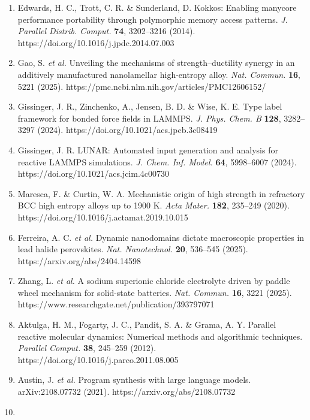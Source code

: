 \documentclass[
  11pt,
]{article}
\begin{document}
\begin{enumerate}
  Implementing molecular dynamics on hybrid high performance computers
  --- short range forces. \emph{Comput. Phys. Commun.} \textbf{182},
  898--911 (2011). https://doi.org/10.1016/j.cpc.2010.12.021
\item
  Edwards, H. C., Trott, C. R. \& Sunderland, D. Kokkos: Enabling
  manycore performance portability through polymorphic memory access
  patterns. \emph{J. Parallel Distrib. Comput.} \textbf{74}, 3202--3216
  (2014). https://doi.org/10.1016/j.jpdc.2014.07.003
\item
  Gao, S. \emph{et al.} Unveiling the mechanisms of strength--ductility
  synergy in an additively manufactured nanolamellar high-entropy alloy.
  \emph{Nat. Commun.} \textbf{16}, 5221 (2025).
  https://pmc.ncbi.nlm.nih.gov/articles/PMC12606152/
\item
  Gissinger, J. R., Zinchenko, A., Jensen, B. D. \& Wise, K. E. Type
  label framework for bonded force fields in LAMMPS. \emph{J. Phys.
  Chem. B} \textbf{128}, 3282--3297 (2024).
  https://doi.org/10.1021/acs.jpcb.3c08419
\item
  Gissinger, J. R. LUNAR: Automated input generation and analysis for
  reactive LAMMPS simulations. \emph{J. Chem. Inf. Model.} \textbf{64},
  5998--6007 (2024). https://doi.org/10.1021/acs.jcim.4c00730
\item
  Maresca, F. \& Curtin, W. A. Mechanistic origin of high strength in
  refractory BCC high entropy alloys up to 1900 K. \emph{Acta Mater.}
  \textbf{182}, 235--249 (2020).
  https://doi.org/10.1016/j.actamat.2019.10.015
\item
  Ferreira, A. C. \emph{et al.} Dynamic nanodomains dictate macroscopic
  properties in lead halide perovskites. \emph{Nat. Nanotechnol.}
  \textbf{20}, 536--545 (2025). https://arxiv.org/abs/2404.14598
\item
  Zhang, L. \emph{et al.} A sodium superionic chloride electrolyte
  driven by paddle wheel mechanism for solid-state batteries. \emph{Nat.
  Commun.} \textbf{16}, 3221 (2025).
  https://www.researchgate.net/publication/393797071
\item
  Aktulga, H. M., Fogarty, J. C., Pandit, S. A. \& Grama, A. Y. Parallel
  reactive molecular dynamics: Numerical methods and algorithmic
  techniques. \emph{Parallel Comput.} \textbf{38}, 245--259 (2012).
  https://doi.org/10.1016/j.parco.2011.08.005
\item
  Austin, J. \emph{et al.} Program synthesis with large language models.
  arXiv:2108.07732 (2021). https://arxiv.org/abs/2108.07732
\item

\end{enumerate}
\end{document}
